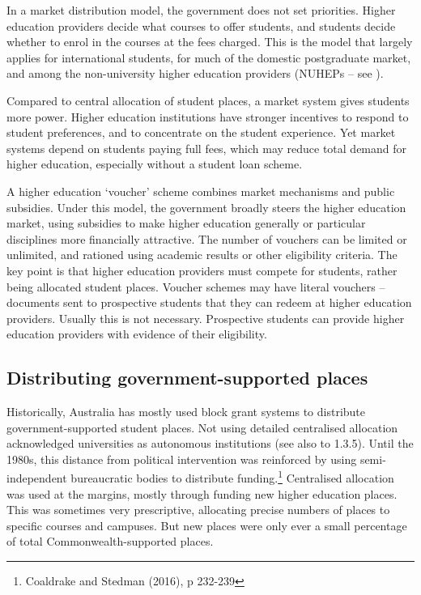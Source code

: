 \documentclass{grattan}
\begin{document}
In a market distribution model, the government does not set priorities. Higher education providers decide what courses to offer students, and students decide whether to enrol in the courses at the fees charged. This is the model that largely applies for international students, for much of the domestic postgraduate market, and among the non-university higher education providers (NUHEPs -- see ).

Compared to central allocation of student places, a market system gives students more power. Higher education institutions have stronger incentives to respond to student preferences, and to concentrate on the student experience. Yet market systems depend on students paying full fees, which may reduce total demand for higher education, especially without a student loan scheme.

A higher education `voucher' scheme combines market mechanisms and public subsidies. Under this model, the government broadly steers the higher education market, using subsidies to make higher education generally or particular disciplines more financially attractive. The number of vouchers can be limited or unlimited, and rationed using academic results or other eligibility criteria. The key point is that higher education providers must compete for students, rather being allocated student places. Voucher schemes may have literal vouchers -- documents sent to prospective students that they can redeem at higher education providers. Usually this is not necessary. Prospective students can provide higher education providers with evidence of their eligibility.

%
\subsection{Distributing government-supported places}\label{subsec:distributing-government-supported-places}

Historically, Australia has mostly used block grant systems to distribute government-supported student places. Not using detailed centralised allocation acknowledged universities as autonomous institutions (see also  to 1.3.5). Until the 1980s, this distance from political intervention was reinforced by using semi-independent bureaucratic bodies to distribute funding.\footnote{Coaldrake and Stedman (2016), p 232-239} Centralised allocation was used at the margins, mostly through funding new higher education places. This was sometimes very prescriptive, allocating precise numbers of places to specific courses and campuses. But new places were only ever a small percentage of total Commonwealth-supported places.
\end{document}
